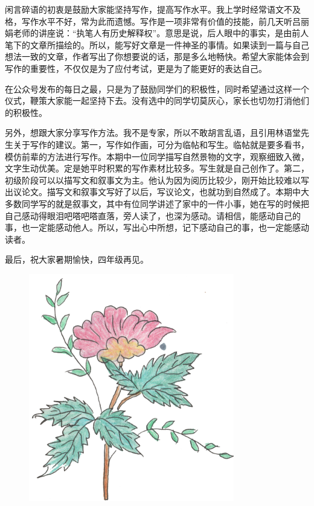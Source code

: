闲言碎语的初衷是鼓励大家能坚持写作，提高写作水平。我上学时经常语文不及格，写作水平不好，常为此而遗憾。写作是一项非常有价值的技能，前几天听吕丽娟老师的讲座说：“执笔人有历史解释权”。意思是说，后人眼中的事实，是由前人笔下的文章所描绘的。所以，能写好文章是一件神圣的事情。如果读到一篇与自己想法一致的文章，作者写出了你想要说的话，那是多么地畅快。希望大家能体会到写作的重要性，不仅仅是为了应付考试，更是为了能更好的表达自己。

在公众号发布的每日之最，只是为了鼓励同学们的积极性，同时希望通过这样一个仪式，鞭策大家能一起坚持下去。没有选中的同学切莫灰心，家长也切勿打消他们的积极性。

另外，想跟大家分享写作方法。我不是专家，所以不敢胡言乱语，且引用林语堂先生关于写作的建议。第一，写作如作画，可分为临帖和写生。临帖就是要多看书，模仿前辈的方法进行写作。本期中一位同学描写自然景物的文字，观察细致入微，文字生动优美。定是她平时积累的写作素材比较多。写生就是自己创作了。第二，初级阶段可以以描写文和叙事文为主。他认为因为阅历比较少，刚开始比较难以写出议论文。描写文和叙事文写好了以后，写议论文，也就功到自然成了。本期中大多数同学写的就是叙事文，其中有位同学讲述了家中的一件小事，她在写的时候把自己感动得眼泪吧嗒吧嗒直落，旁人读了，也深为感动。请相信，能感动自己的事，也一定能感动他人。所以，写出心中所想，记下感动自己的事，也一定能感动读者。

最后，祝大家暑期愉快，四年级再见。


\begin{figure}[htb]
    \centering
    \includegraphics[width=0.8\textwidth]{figure/03.png}
\end{figure}